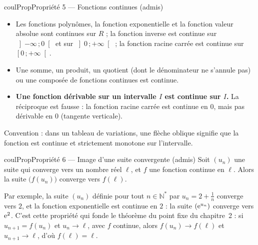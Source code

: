 \documentclass[11pt,a4paper]{article}
\makeatletter
\newcommand{\R}{\mathbb{R}}
\newcommand{\N}{\mathbb{N}}
\newcommand{\Ns}{\mathbb{N}^{*}}
\newcommand{\Z}{\mathbb{Z}}
\newcommand{\Q}{\mathbb{Q}}
\newcommand{\vect}[1]{\overrightarrow{#1}}
\newcommand{\fois}[1]{\times{\color{coulExo}#1}}
\newcommand{\lycee@intfo}[2]{\left[#1\,;#2\right[}
\newcommand{\lycee@intoo}[2]{\left]#1\,;#2\right[}
\providecommand{\Cf}{\mathcal{C}\sb{f}}%
\providecommand{\Cg}{\mathcal{C}\sb{g}}%
\providecommand{\intfo}{\lycee@intfo}%
\providecommand{\intoo}{\lycee@intoo}%
\newcounter{lycee@signet}
\newcommand{\signet}[3][]{\stepcounter{lycee@signet}%
  \edef\lycee@dest{\if\relax\detokenize{#1}\relax
    signet.\arabic{lycee@signet}\else#1\fi}%
  \hypertarget{\lycee@dest}{}\bookmark[level=#2,dest=\lycee@dest]{#3}}
\def\R{R}\def\N{N}\def\Z{Z}\def\Q{Q}\def\vect#1{#1}\def\Cf{Cf}\def\Cg{Cg}\def\fois#1{×#1}%
\newenvironment{proprietebox}[1][Propriété]%
  {\begin{boitecours}[phantom={\signet{2}{#1}}]{coulProp}{#1}}{\end{boitecours}}
\makeatother
\begin{document}
\begin{proprietebox}[Propriété 5 --- Fonctions continues (admis)]
\begin{itemize}
  \item Les fonctions polynômes, la fonction exponentielle et la fonction valeur absolue
        sont continues sur $\R$ ; la fonction inverse est continue sur
        $\intoo{-\infty}{0}$ et sur $\intoo{0}{+\infty}$ ; la fonction racine carrée est
        continue sur $\intfo{0}{+\infty}$.
  \item Une somme, un produit, un quotient (dont le dénominateur ne s'annule pas) ou une
        composée de fonctions continues est continue.
  \item \textbf{Une fonction dérivable sur un intervalle $I$ est continue sur $I$.} La
        réciproque est fausse : la fonction racine carrée est continue en $0$, mais pas
        dérivable en $0$ (tangente verticale).
\end{itemize}
Convention : dans un tableau de variations, une flèche oblique signifie que la fonction
est continue et strictement monotone sur l'intervalle.
\end{proprietebox}

\begin{proprietebox}[Propriété 6 --- Image d'une suite convergente (admis)]
Soit $(u_{n})$ une suite qui converge vers un nombre réel $\ell$, et $f$ une fonction
continue en $\ell$. Alors la suite $\bigl(f(u_{n})\bigr)$ converge vers $f(\ell)$.

\smallskip
Par exemple, la suite $(u_{n})$ définie pour tout $n\in\Ns$ par $u_{n}=2+\frac{1}{n}$
converge vers $2$, et la fonction exponentielle est continue en $2$ : la suite
$\left(\mathrm{e}^{u_{n}}\right)$ converge vers $\mathrm{e}^{2}$. C'est cette propriété qui fonde le
théorème du point fixe du chapitre~2 : si $u_{n+1}=f(u_{n})$ et $u_{n}\to\ell$, avec $f$
continue, alors $f(u_{n})\to f(\ell)$ et $u_{n+1}\to\ell$, d'où $f(\ell)=\ell$.
\end{proprietebox}
\end{document}
